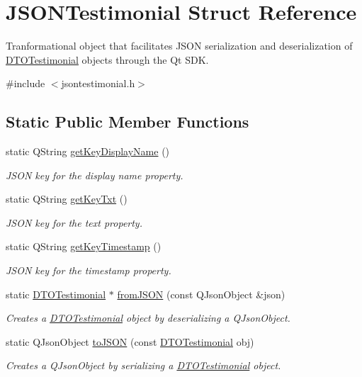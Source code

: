 \hypertarget{struct_j_s_o_n_testimonial}{}\section{J\+S\+O\+N\+Testimonial Struct Reference}
\label{struct_j_s_o_n_testimonial}


Tranformational object that facilitates J\+S\+ON serialization and deserialization of \mbox{\hyperlink{struct_d_t_o_testimonial}{D\+T\+O\+Testimonial}} objects through the Qt S\+DK.  




{\ttfamily \#include $<$jsontestimonial.\+h$>$}

\subsection*{Static Public Member Functions}
\begin{DoxyCompactItemize}
\item 
static Q\+String \mbox{\hyperlink{struct_j_s_o_n_testimonial_ab6d5712fea11f101268091f80e865e14}{get\+Key\+Display\+Name}} ()
\begin{DoxyCompactList}\small\item\em J\+S\+ON key for the display name property. \end{DoxyCompactList}\item 
static Q\+String \mbox{\hyperlink{struct_j_s_o_n_testimonial_a5c08de626bca9d46be7728e8585d3638}{get\+Key\+Txt}} ()
\begin{DoxyCompactList}\small\item\em J\+S\+ON key for the text property. \end{DoxyCompactList}\item 
static Q\+String \mbox{\hyperlink{struct_j_s_o_n_testimonial_a367b6f1aa534c14199888a0cf6dfe8df}{get\+Key\+Timestamp}} ()
\begin{DoxyCompactList}\small\item\em J\+S\+ON key for the timestamp property. \end{DoxyCompactList}\item 
static \mbox{\hyperlink{struct_d_t_o_testimonial}{D\+T\+O\+Testimonial}} $\ast$ \mbox{\hyperlink{struct_j_s_o_n_testimonial_a8b6b42ef202b1566b27b0d42a3074650}{from\+J\+S\+ON}} (const Q\+Json\+Object \&json)
\begin{DoxyCompactList}\small\item\em Creates a \mbox{\hyperlink{struct_d_t_o_testimonial}{D\+T\+O\+Testimonial}} object by deserializing a Q\+Json\+Object. \end{DoxyCompactList}\item 
static Q\+Json\+Object \mbox{\hyperlink{struct_j_s_o_n_testimonial_a9fcbce44173627482821d8912f8531d5}{to\+J\+S\+ON}} (const \mbox{\hyperlink{struct_d_t_o_testimonial}{D\+T\+O\+Testimonial}} obj)
\begin{DoxyCompactList}\small\item\em Creates a Q\+Json\+Object by serializing a \mbox{\hyperlink{struct_d_t_o_testimonial}{D\+T\+O\+Testimonial}} object. \end{DoxyCompactList}\end{DoxyCompactItemize}


